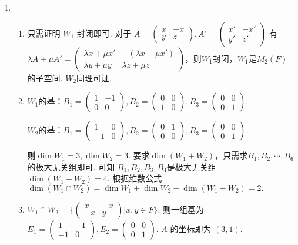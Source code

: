 \begin{enumerate}
    \item \begin{enumerate}
        \item 只需证明 $W_1$ 封闭即可. 对于 $A=\begin{pmatrix}
            x&-x\\y&z
        \end{pmatrix},A'=\begin{pmatrix}
        x'&-x'\\y'&z'
        \end{pmatrix}$ 有 $\lambda A+\mu A'=\begin{pmatrix}
            \lambda x+\mu x'&-(\lambda x+\mu x')\\\lambda y+\mu y&\lambda z+\mu z
        \end{pmatrix}$，则$W_1$封闭，$W_1$是$M_2(F)$的子空间.	$W_2$同理可证.
        \item $W_1$的基：$B_1=\begin{pmatrix}1&-1\\0&0\end{pmatrix},B_2=\begin{pmatrix}0&0\\1&0\end{pmatrix},B_3=\begin{pmatrix}0&0\\0&1\end{pmatrix}$.

        $W_2$的基：$B_1=\begin{pmatrix}1&0\\-1&0\end{pmatrix},B_2=\begin{pmatrix}0&1\\0&0\end{pmatrix},B_3=\begin{pmatrix}0&0\\0&1\end{pmatrix}$.

        则$\dim W_1=3,\dim W_2=3$. 要求$\dim  (W_1+W_2)$，只需求$B_1,B_2,\cdots ,B_6$的极大无关组即可. 可知 $B_1,B_2,B_3,B_4$是极大无关组.	$\dim  (W_1+W_2)=4$. 根据维数公式$\dim (W_1\cap W_2)=\dim W_1+\dim W_2-\dim (W_1+W_2)=2.$
        \item $W_1\cap W_2=\{\begin{pmatrix}x&-x\\-x&y\end{pmatrix}|x,y\in F\}$. 则一组基为$E_1=\begin{pmatrix}1&-1\\-1&0\end{pmatrix},E_2=\begin{pmatrix}0&0\\0&1\end{pmatrix}$. $A$ 的坐标即为 $(3,1)$.
    \end{enumerate}


\end{enumerate}

